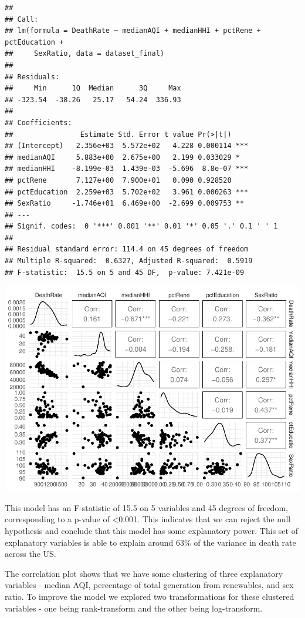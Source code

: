 \documentclass[
]{article}
\begin{document}
\begin{verbatim}
## 
## Call:
## lm(formula = DeathRate ~ medianAQI + medianHHI + pctRene + pctEducation + 
##     SexRatio, data = dataset_final)
## 
## Residuals:
##     Min      1Q  Median      3Q     Max 
## -323.54  -38.26   25.17   54.24  336.93 
## 
## Coefficients:
##                Estimate Std. Error t value Pr(>|t|)    
## (Intercept)   2.356e+03  5.572e+02   4.228 0.000114 ***
## medianAQI     5.883e+00  2.675e+00   2.199 0.033029 *  
## medianHHI    -8.199e-03  1.439e-03  -5.696  8.8e-07 ***
## pctRene       7.127e+00  7.900e+01   0.090 0.928520    
## pctEducation  2.259e+03  5.702e+02   3.961 0.000263 ***
## SexRatio     -1.746e+01  6.469e+00  -2.699 0.009753 ** 
## ---
## Signif. codes:  0 '***' 0.001 '**' 0.01 '*' 0.05 '.' 0.1 ' ' 1
## 
## Residual standard error: 114.4 on 45 degrees of freedom
## Multiple R-squared:  0.6327, Adjusted R-squared:  0.5919 
## F-statistic:  15.5 on 5 and 45 DF,  p-value: 7.421e-09
\end{verbatim}

\begin{center}\includegraphics{EDA_Project_Mutha_Kry_Ghosh_VS_files/figure-latex/model1 results-1} \end{center}

This model has an F-statistic of 15.5 on 5 variables and 45 degrees of
freedom, corresponding to a p-value of \textless0.001. This indicates
that we can reject the null hypothesis and conclude that this model has
some explanatory power. This set of explanatory variables is able to
explain around 63\% of the variance in death rate across the US.

The correlation plot shows that we have some clustering of three
explanatory variables - median AQI, percentage of total generation from
renewables, and sex ratio. To improve the model we explored two
transformations for these clustered variables - one being rank-transform
and the other being log-transform.
\end{document}
